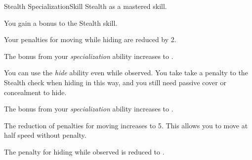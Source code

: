     \begin{feat}{Stealth Specialization}{Skill}
        \featpre Stealth as a mastered skill.

         You gain a  bonus to the Stealth skill.

        \ff[2]{}

         Your penalties for moving while hiding are reduced by 2.

         The bonus from your \textit{specialization} ability increases to .

         You can use the \textit{hide} ability even while observed.
        You take take a  penalty to the Stealth check when hiding in this way, and you still need passive cover or concealment to hide.

         The bonus from your \textit{specialization} ability increases to .

         The reduction of penalties for moving increases to 5.
        This allows you to move at half speed without penalty.

         The penalty for hiding while observed is reduced to .
    \end{feat}

